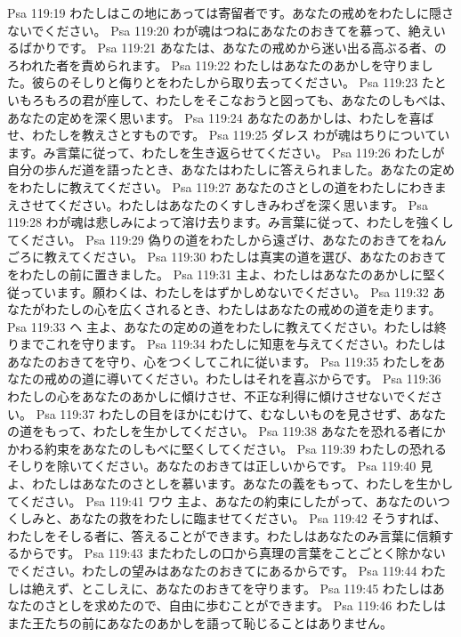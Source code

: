 Psa 119:19  わたしはこの地にあっては寄留者です。あなたの戒めをわたしに隠さないでください。
Psa 119:20  わが魂はつねにあなたのおきてを慕って、絶えいるばかりです。
Psa 119:21  あなたは、あなたの戒めから迷い出る高ぶる者、のろわれた者を責められます。
Psa 119:22  わたしはあなたのあかしを守りました。彼らのそしりと侮りとをわたしから取り去ってください。
Psa 119:23  たといもろもろの君が座して、わたしをそこなおうと図っても、あなたのしもべは、あなたの定めを深く思います。
Psa 119:24  あなたのあかしは、わたしを喜ばせ、わたしを教えさとすものです。
Psa 119:25  ダレス わが魂はちりについています。み言葉に従って、わたしを生き返らせてください。
Psa 119:26  わたしが自分の歩んだ道を語ったとき、あなたはわたしに答えられました。あなたの定めをわたしに教えてください。
Psa 119:27  あなたのさとしの道をわたしにわきまえさせてください。わたしはあなたのくすしきみわざを深く思います。
Psa 119:28  わが魂は悲しみによって溶け去ります。み言葉に従って、わたしを強くしてください。
Psa 119:29  偽りの道をわたしから遠ざけ、あなたのおきてをねんごろに教えてください。
Psa 119:30  わたしは真実の道を選び、あなたのおきてをわたしの前に置きました。
Psa 119:31  主よ、わたしはあなたのあかしに堅く従っています。願わくは、わたしをはずかしめないでください。
Psa 119:32  あなたがわたしの心を広くされるとき、わたしはあなたの戒めの道を走ります。
Psa 119:33  ヘ 主よ、あなたの定めの道をわたしに教えてください。わたしは終りまでこれを守ります。
Psa 119:34  わたしに知恵を与えてください。わたしはあなたのおきてを守り、心をつくしてこれに従います。
Psa 119:35  わたしをあなたの戒めの道に導いてください。わたしはそれを喜ぶからです。
Psa 119:36  わたしの心をあなたのあかしに傾けさせ、不正な利得に傾けさせないでください。
Psa 119:37  わたしの目をほかにむけて、むなしいものを見させず、あなたの道をもって、わたしを生かしてください。
Psa 119:38  あなたを恐れる者にかかわる約束をあなたのしもべに堅くしてください。
Psa 119:39  わたしの恐れるそしりを除いてください。あなたのおきては正しいからです。
Psa 119:40  見よ、わたしはあなたのさとしを慕います。あなたの義をもって、わたしを生かしてください。
Psa 119:41  ワウ 主よ、あなたの約束にしたがって、あなたのいつくしみと、あなたの救をわたしに臨ませてください。
Psa 119:42  そうすれば、わたしをそしる者に、答えることができます。わたしはあなたのみ言葉に信頼するからです。
Psa 119:43  またわたしの口から真理の言葉をことごとく除かないでください。わたしの望みはあなたのおきてにあるからです。
Psa 119:44  わたしは絶えず、とこしえに、あなたのおきてを守ります。
Psa 119:45  わたしはあなたのさとしを求めたので、自由に歩むことができます。
Psa 119:46  わたしはまた王たちの前にあなたのあかしを語って恥じることはありません。
